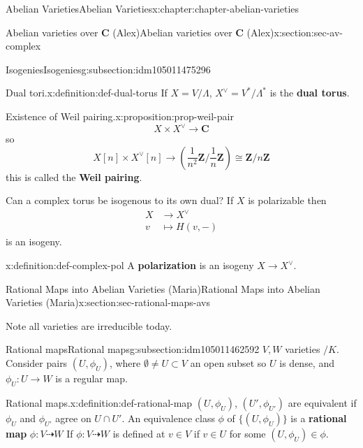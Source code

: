 \documentclass[oneside,10pt,]{book}
\newcommand{\terminology}[1]{\textbf{#1}}
\numberwithin{equation}{section}
\newcommand{\ZZ}{\mathbf{Z}}
\newcommand{\CC}{\mathbf{C}}
\newcommand{\amp}{&}
\begin{document}
\begin{chapterptx}{Abelian Varieties}{}{Abelian Varieties}{}{}{x:chapter:chapter-abelian-varieties}
\begin{sectionptx}{Abelian varieties over \(\CC\) (Alex)}{}{Abelian varieties over \(\CC\) (Alex)}{}{}{x:section:sec-av-complex}
\begin{subsectionptx}{Isogenies}{}{Isogenies}{}{}{g:subsection:idm105011475296}
\begin{definition}{Dual tori.}{x:definition:def-dual-torus}%
If \(X = V/\Lambda\), \(X^\vee = V^*/ \Lambda^*\) is the \terminology{dual torus}.%
\end{definition}
\begin{proposition}{Existence of Weil pairing.}{}{x:proposition:prop-weil-pair}%
%
\begin{equation*}
X\times X^\vee \to \CC
\end{equation*}
so%
\begin{equation*}
X[n] \times X^\vee[n] \to \left(\frac{1}{n^2} \ZZ/\frac{1}{n} \ZZ\right) \cong \ZZ/n\ZZ
\end{equation*}
this is called the \terminology{Weil pairing}.%
\end{proposition}
Can a complex torus be isogenous to its own dual? If \(X\) is polarizable then%
\begin{align*}
X \amp\to X^\vee\\
v\amp\mapsto H(v,-)
\end{align*}
is an isogeny.%
\begin{definition}{}{x:definition:def-complex-pol}%
A \terminology{polarization} is an isogeny \(X \to X^\vee\).%
\end{definition}
\end{subsectionptx}
\end{sectionptx}
%
%
\typeout{************************************************}
\typeout{************************************************}
%
\begin{sectionptx}{Rational Maps into Abelian Varieties (Maria)}{}{Rational Maps into Abelian Varieties (Maria)}{}{}{x:section:sec-rational-maps-avs}
\begin{introduction}{}%
Note all varieties are irreducible today.%
\end{introduction}%
%
%
\typeout{************************************************}
\typeout{************************************************}
%
\begin{subsectionptx}{Rational maps}{}{Rational maps}{}{}{g:subsection:idm105011462592}
\(V,W\) varieties \(/K\). Consider pairs \((U,\phi_U)\), where \(\emptyset \ne  U \subset V\) an open subset so \(U\) is dense, and \(\phi_U \colon U \to W\) is a regular map.%
\begin{definition}{Rational maps.}{x:definition:def-rational-map}%
\((U,\phi_U)\), \((U',{\phi_{U'}})\) are equivalent if \(\phi_U\) and \(\phi_{U'}\) agree on \(U \cap U'\). An equivalence class \(\phi\) of \(\{(U, \phi_U)\}\) is a \terminology{rational map} \(\phi \colon V \dashrightarrow W\) If \(\phi\colon V \dashrightarrow W\) is defined at   \(v\in V\) if \(v\in U\) for some \((U,\phi_U) \in \phi\).%

\end{definition}
\end{subsectionptx}
\end{sectionptx}
\end{chapterptx}
\end{document}
